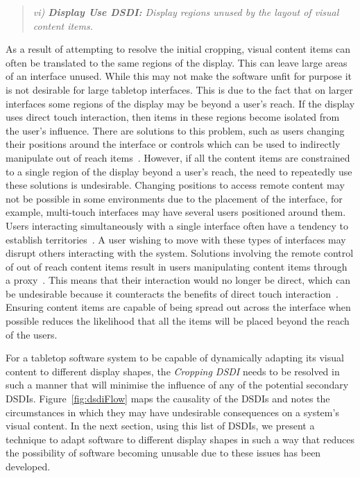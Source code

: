 \documentclass{bmcart}
\begin{document}
\begin{quote}\emph{vi) \textbf{Display Use \ac{DSDI}:} Display regions unused by the layout of visual content items.}\end{quote}

As a result of attempting to resolve the initial cropping, visual content items can often be translated to the same regions of the display.
This can leave large areas of an interface unused.
While this may not make the software unfit for purpose it is not desirable for large tabletop interfaces.
This is due to the fact that on larger interfaces some regions of the display may be beyond a user's reach.
If the display uses direct touch interaction, then items in these regions become isolated from the user's influence.
There are solutions to this problem, such as users changing their positions around the interface or controls which can be used to indirectly manipulate out of reach items~\cite{Ryall2006a}.
However, if all the content items are constrained to a single region of the display beyond a user's reach, the need to repeatedly use these solutions is undesirable.
Changing positions to access remote content may not be possible in some environments due to the placement of the interface, for example, multi-touch interfaces may have several users positioned around them.
Users interacting simultaneously with a single interface often have a tendency to establish territories~\cite{scott2004}.
A user wishing to move with these types of interfaces may disrupt others interacting with the system.
Solutions involving the remote control of out of reach content items result in users manipulating content items through a proxy~\cite{Smith11}.
This means that their interaction would no longer be direct, which can be undesirable because it counteracts the benefits of direct touch interaction~\cite{Schoning2008}.
Ensuring content items are capable of being spread out across the interface when possible reduces the likelihood that all the items will be placed beyond the reach of the users.

For a tabletop software system to be capable of dynamically adapting its visual content to different display shapes, the {\emph{Cropping \ac{DSDI}}} needs to be resolved in such a manner that will minimise the influence of any of the potential secondary \acp{DSDI}.
Figure~\ref{fig:dsdiFlow} maps the causality of the \acp{DSDI} and notes the circumstances in which they may have undesirable consequences on a system's visual content.
In the next section, using this list of \acp{DSDI}, we present a technique to adapt software to different display shapes in such a way that reduces the possibility of software becoming unusable due to these issues has been developed.
\end{document}
